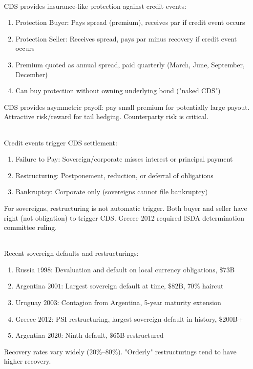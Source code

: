 \begin{remark} \\
CDS provides insurance-like protection against credit events:
\begin{enumerate}[label=\roman*.]
\setlength{\itemsep}{0pt}
\item Protection Buyer: Pays spread (premium), receives par if credit event occurs
\item Protection Seller: Receives spread, pays par minus recovery if credit event occurs
\item Premium quoted as annual spread, paid quarterly (March, June, September, December)
\item Can buy protection without owning underlying bond ("naked CDS")
\end{enumerate}
CDS provides asymmetric payoff: pay small premium for potentially large payout. Attractive risk/reward for tail hedging. Counterparty risk is critical.
\end{remark}

\begin{remark} \\
Credit events trigger CDS settlement:
\begin{enumerate}[label=\roman*.]
\setlength{\itemsep}{0pt}
\item Failure to Pay: Sovereign/corporate misses interest or principal payment
\item Restructuring: Postponement, reduction, or deferral of obligations
\item Bankruptcy: Corporate only (sovereigns cannot file bankruptcy)
\end{enumerate}
For sovereigns, restructuring is not automatic trigger. Both buyer and seller have right (not obligation) to trigger CDS. Greece 2012 required ISDA determination committee ruling.
\end{remark}

\begin{remark} \\
Recent sovereign defaults and restructurings:
\begin{enumerate}[label=\roman*.]
\setlength{\itemsep}{0pt}
\item Russia $1998$: Devaluation and default on local currency obligations, $\$73$B
\item Argentina $2001$: Largest sovereign default at time, $\$82$B, $70\%$ haircut
\item Uruguay $2003$: Contagion from Argentina, 5-year maturity extension
\item Greece $2012$: PSI restructuring, largest sovereign default in history, $\$200$B+
\item Argentina $2020$: Ninth default, $\$65$B restructured
\end{enumerate}
Recovery rates vary widely ($20\%$--$80\%$). "Orderly" restructurings tend to have higher recovery.
\end{remark}

